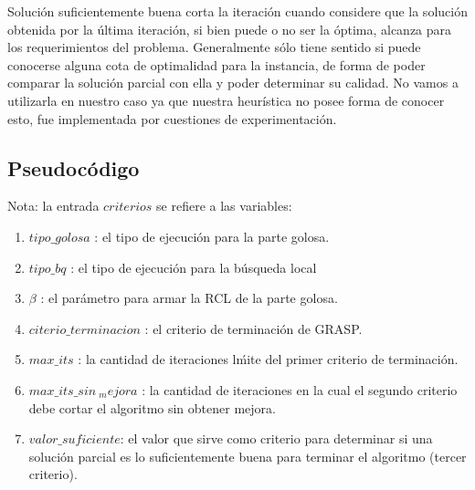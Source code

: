 \vspace{2mm}

Soluci\'on suficientemente buena corta la iteraci\'on cuando considere que la soluci\'on obtenida por la \'ultima iteraci\'on, si bien puede o no ser la \'optima, alcanza para los requerimientos del problema. Generalmente s\'olo tiene sentido si puede conocerse alguna cota de optimalidad para la instancia, de forma de poder comparar la soluci\'on parcial con ella y poder determinar su calidad. No vamos a utilizarla en nuestro caso ya que nuestra heur\'istica no posee forma de conocer esto, fue implementada por cuestiones de experimentaci\'on.

\vspace{2mm}

\subsection{Pseudoc\'odigo}

Nota: la entrada $criterios$ se refiere a las variables:

\begin{enumerate}
\item $tipo\_golosa$ : el tipo de ejecuci\'on para la parte golosa.
\item $tipo\_bq$ : el tipo de ejecuci\'on para la b\'usqueda local
\item $\beta$ : el par\'ametro para armar la RCL de la parte golosa.
\item $citerio\_terminacion$ : el criterio de terminaci\'on de GRASP.
\item $max\_its$ : la cantidad de iteraciones l\'mite del primer criterio de terminaci\'on.
\item $max\_its\_sin\ _mejora$ : la cantidad de iteraciones en la cual el segundo criterio debe cortar el algoritmo sin obtener mejora.
\item $ valor\_suficiente $: el valor que sirve como criterio para determinar si una soluci\'on parcial es lo suficientemente buena para terminar el algoritmo (tercer criterio).
\end{enumerate}

